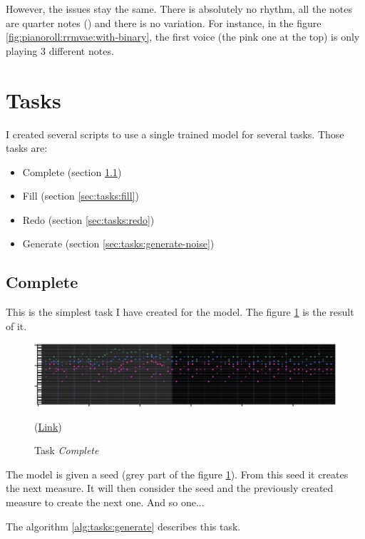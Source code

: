\documentclass[12pt]{report}
\begin{document}
However, the issues stay the same.
There is absolutely no rhythm, all the notes are quarter notes (\musQuarter) and there is no variation.
For instance, in the figure \ref{fig:pianoroll:rrmvae:with-binary}, the first voice (the pink one at the top) is only playing 3 different notes.

\section{Tasks}
\label{sec:tasks}

I created several scripts to use a single trained model for several tasks.
Those tasks are:
\begin{itemize}
    \item Complete (section \ref{sec:tasks:generate})
    \item Fill (section \ref{sec:tasks:fill})
    \item Redo (section \ref{sec:tasks:redo})
    \item Generate (section \ref{sec:tasks:generate-noise})
\end{itemize}


\subsection{Complete}
\label{sec:tasks:generate}

This is the simplest task I have created for the model.
The figure \ref{fig:tasks:generate} is the result of it.

\begin{figure}[htbp]
    \centering
    \includegraphics[width=\textwidth]{images/generated_midis/tasks/generate/generate.jpg}
    \caption{Task \textit{Complete}}
    (\href{https://github.com/ValentinVignal/midiGenerator/blob/master/samples/tasks/generate.mid}{Link})
    \label{fig:tasks:generate}
\end{figure}

The model is given a seed (grey part of the figure \ref{fig:tasks:generate}).
From this seed it creates the next measure.
It will then consider the seed and the previously created measure to create the next one.
And so one...

The algorithm \ref{alg:tasks:generate} describes this task.
\end{document}
